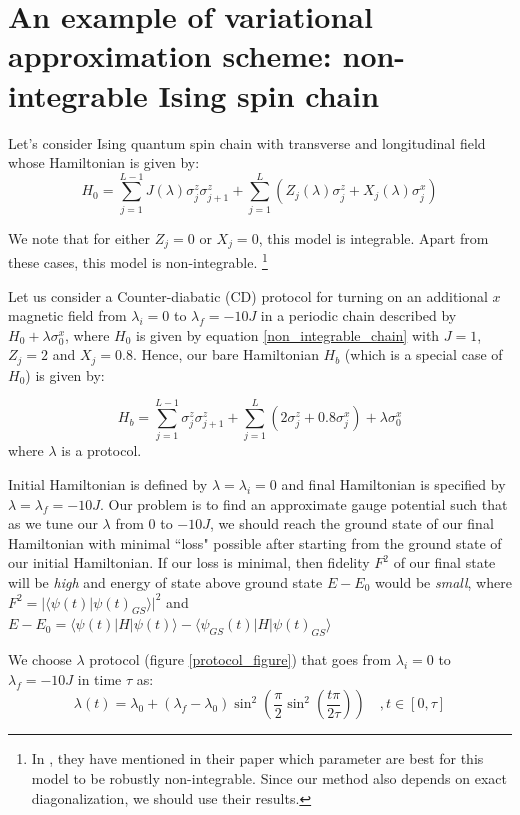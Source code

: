 \documentclass[11pt,a4paper]{article}
\begin{document}
\section{An example of variational approximation scheme: non-integrable Ising spin chain}
Let's consider Ising quantum spin chain with transverse and longitudinal field whose Hamiltonian is given by:
\begin{equation}
H_0=\sum_{j=1}^{L-1} J(\lambda) \sigma_j^z \sigma_{j+1}^z + \sum_{j=1}^{L}  (Z_j (\lambda) \sigma_j^z +X_j (\lambda) \sigma_j^x)
\label{non_integrable_chain}
\end{equation}

We note that for either $Z_j=0$ or $X_j=0$, this model is integrable. Apart from these cases, this model is non-integrable. \footnote{In \cite{kim2013ballistic}, they have mentioned in their paper which parameter are best for this model to be robustly non-integrable. Since our method also depends on exact diagonalization, we should use their results.}

Let us consider a Counter-diabatic (CD) protocol for turning on an additional $x$ magnetic field from $\lambda_i=0$ to $\lambda_f=-10 J$ in a periodic chain described by $H_0 + \lambda \sigma_0^x$, where $H_0$ is given by equation \ref{non_integrable_chain} with $J=1$, $Z_j=2$ and $X_j=0.8$. Hence, our bare Hamiltonian $H_b$ (which is a special case of $H_0$) is given by:

\begin{equation}
H_b=\sum_{j=1}^{L-1}  \sigma_j^z \sigma_{j+1}^z + \sum_{j=1}^{L}   ( 2 \sigma_j^z + 0.8 \sigma_j^x) +\lambda \sigma_0^x
\label{non_integrable_chain_bare}
\end{equation}
where $\lambda$ is a protocol. 

Initial Hamiltonian is defined by $\lambda=\lambda_i=0$ and final Hamiltonian is specified by $\lambda=\lambda_f=-10J$. Our problem is to find an approximate gauge potential such that as we tune our $\lambda$ from $0$ to $-10J$, we should reach the ground state of our final Hamiltonian with minimal ``loss" possible after starting from the ground state of our initial Hamiltonian. If our loss is minimal, then fidelity $F^2$ of our final state will be \textit{high} and energy of state above ground state $E-E_0$ would be \textit{small}, where  $F^2 =  |\langle \psi (t) |\psi(t)_{GS}\rangle|^2$ and $ E-E_0=\langle \psi (t) |H|\psi(t)\rangle - \langle \psi_{GS} (t) |H|\psi(t)_{GS}\rangle$ 

 We choose $\lambda$  protocol (figure \ref{protocol_figure}) that goes from $\lambda_i=0$ to $\lambda_f=-10 J$ in time $\tau$ as:
\begin{equation}
\lambda(t) = \lambda_0 + (\lambda_f-\lambda_0)\sin^2\left(\dfrac{\pi}{2}\sin^2\left(\dfrac{t\pi}{2 \tau}\right)  \right) \quad, t \in [0, \tau]
\end{equation}
\end{document}
